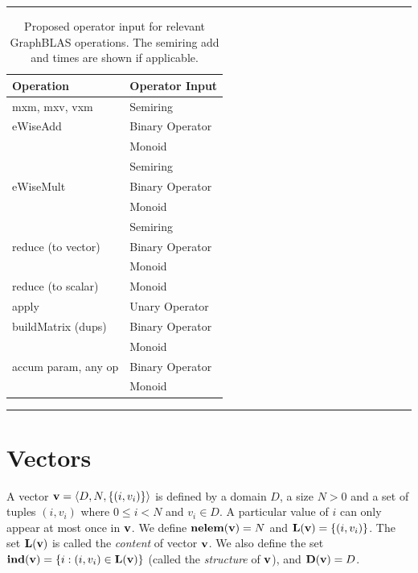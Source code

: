 \begin{table}
    \hrule
    \begin{center}
        \caption{Proposed operator input for relevant GraphBLAS operations. 
        The semiring add and times are shown if applicable.}
        \label{Tab:OperatorInputType}
        \begin{tabular}{l|l}
        Operation           & Operator Input  \\ \hline
        {\sf mxm, mxv, vxm} & Semiring \\ \hline
        {\sf eWiseAdd}      & Binary Operator   \\
                            & Monoid           \\
                            & Semiring          \\ \hline
        {\sf eWiseMult}     & Binary Operator   \\
                            & Monoid          \\
                            & Semiring         \\ \hline
  {\sf reduce} (to vector)  & Binary Operator            \\ 
                            & Monoid           \\ \hline
  {\sf reduce} (to scalar)  & Monoid           \\ \hline
        {\sf apply}         & Unary Operator   \\ \hline
  {\sf buildMatrix} (dups)  & Binary Operator   \\
                            & Monoid           \\ \hline
{\sf accum} param, any op   & Binary Operator  \\
                            & Monoid            \\ 
        \end{tabular}
    \end{center}
    \hrule
\end{table}

\section{Vectors}
\label{Sec:Vectors}

A vector ${\bf v} = \langle D, N, \{ (i,v_i) \} \rangle$ is defined by
a domain $D$, a size $N>0$ and a set of tuples $(i,v_i)$ where $0 \leq
i < N$ and $v_i \in D$. A particular value of $i$ can only appear at
most once in ${\bf v}$. We define $\bold{nelem}({\bf v}) = N$ and
$\bold{L}({\bf v}) = \{ (i,v_i) \}$. The set $\bold{L}({\bf v})$ is
called the \emph{content} of vector ${\bf v}$. We also define the set
${\bf ind({\bf v})} = \{ i : (i,v_i) \in \bold{L}({\bf v}) \}$
(called the \emph{structure} of ${\bf v}$), and $\bold{D}({\bf v})
= D$.

